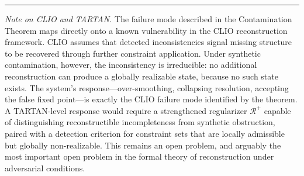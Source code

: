 \documentclass[12pt, letterpaper]{article}
\theoremstyle{flyxion}
\begin{document}
\vspace{2em}

\begin{center}
  \textcolor{rulecolor}{\rule{0.5\textwidth}{0.4pt}}
\end{center}

\vspace{1em}

\noindent\textit{Note on CLIO and TARTAN.} The failure mode described in the Contamination Theorem maps directly onto a known vulnerability in the CLIO reconstruction framework. CLIO assumes that detected inconsistencies signal missing structure to be recovered through further constraint application. Under synthetic contamination, however, the inconsistency is irreducible: no additional reconstruction can produce a globally realizable state, because no such state exists. The system's response---over-smoothing, collapsing resolution, accepting the false fixed point---is exactly the CLIO failure mode identified by the theorem. A TARTAN-level response would require a strengthened regularizer $\mathcal{R}^+$ capable of distinguishing reconstructible incompleteness from synthetic obstruction, paired with a detection criterion for constraint sets that are locally admissible but globally non-realizable. This remains an open problem, and arguably the most important open problem in the formal theory of reconstruction under adversarial conditions.

\bigskip
\end{document}
